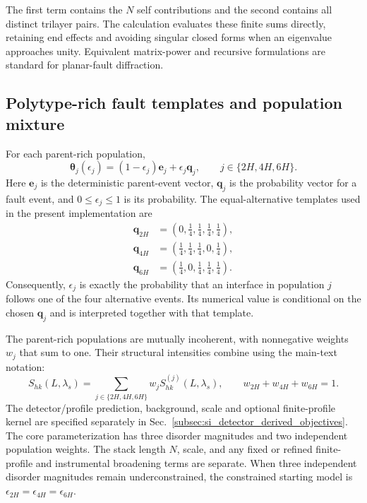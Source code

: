 The first term contains the $N$ self contributions and the second contains all
distinct trilayer pairs.  The calculation evaluates these finite sums
directly, retaining end effects and avoiding singular closed forms when an
eigenvalue approaches unity.  Equivalent matrix-power and recursive
formulations are standard for planar-fault diffraction.\cite{Treacy1991}

\subsection{Polytype-rich fault templates and population mixture}

For each parent-rich population,
\begin{equation}
 \boldsymbol{\theta}_j(\epsilon_j)
 =(1-\epsilon_j)\mathbf e_j+\epsilon_j\mathbf q_j,
 \qquad j\in\{2H,4H,6H\}.
 \label{eq:si_pbi2_fault_parameterization}
\end{equation}
Here $\mathbf e_j$ is the deterministic parent-event vector, $\mathbf q_j$ is the probability vector for a fault event, and $0\leq\epsilon_j\leq1$ is its probability. The equal-alternative templates used in the present implementation are
\begin{align}
 \mathbf q_{2H}&=\left(0,\frac14,\frac14,\frac14,\frac14\right),\\
 \mathbf q_{4H}&=\left(\frac14,\frac14,\frac14,0,\frac14\right),\\
 \mathbf q_{6H}&=\left(\frac14,0,\frac14,\frac14,\frac14\right).
 \label{eq:si_pbi2_fault_templates}
\end{align}
Consequently, $\epsilon_j$ is exactly the probability that an interface in
population $j$ follows one of the four alternative events. Its numerical value is conditional on the chosen $\mathbf q_j$ and is interpreted together with that template.

The parent-rich populations are mutually incoherent, with nonnegative weights $w_j$ that sum to one. Their structural intensities combine using the main-text notation:
\begin{equation}
 S_{hk}(L,\lambda_s)=\sum_{j\in\{2H,4H,6H\}}
 w_jS_{hk}^{(j)}(L,\lambda_s),\qquad
 w_{2H}+w_{4H}+w_{6H}=1.
 \label{eq:si_pbi2_total_intensity}
\end{equation}
The detector/profile prediction, background, scale and optional finite-profile kernel are specified separately in Sec.~\ref{subsec:si_detector_derived_objectives}.
The core parameterization has three disorder magnitudes and two independent
population weights.  The stack length $N$, scale, and any fixed or refined
finite-profile and instrumental broadening terms are separate.  When three independent disorder magnitudes remain underconstrained, the constrained starting model is
$\epsilon_{2H}=\epsilon_{4H}=\epsilon_{6H}$.

